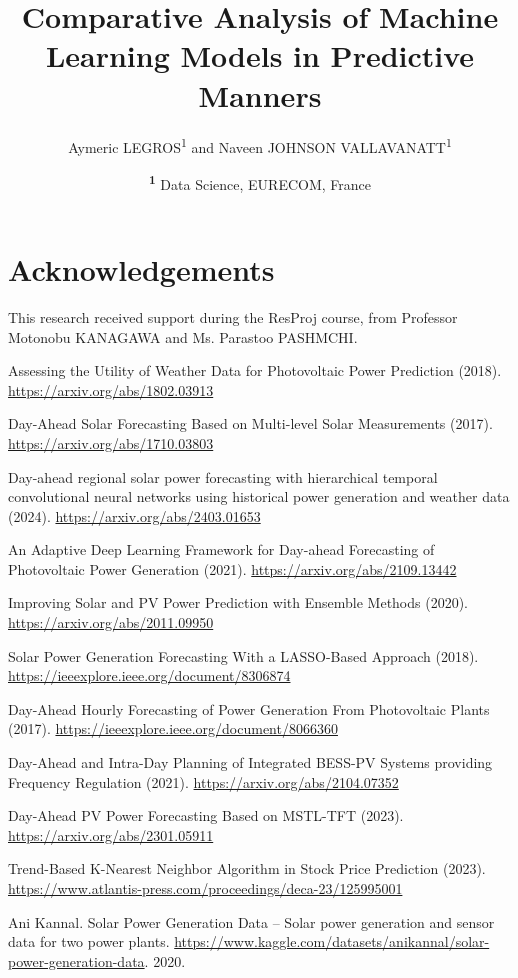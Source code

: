 \documentclass[twocolumn]{NobArticle}
\title{\centering Comparative Analysis of Machine Learning Models in Predictive Manners}
\author{\centering
    Aymeric LEGROS\textsuperscript{1}
    and Naveen JOHNSON VALLAVANATT\textsuperscript{1}
}
\date{\centering
    \textsuperscript{\textbf{1}}
    Data Science, EURECOM, France \\
}
\begin{document}
\small
\maketitle







\section*{Acknowledgements}
This research received support during the ResProj course, from Professor Motonobu KANAGAWA and Ms. Parastoo PASHMCHI.

\begin{thebibliography}{9}

Assessing the Utility of Weather Data for Photovoltaic Power Prediction (2018).
\url{https://arxiv.org/abs/1802.03913}

Day-Ahead Solar Forecasting Based on Multi-level Solar Measurements (2017).
\url{https://arxiv.org/abs/1710.03803}

Day-ahead regional solar power forecasting with hierarchical temporal convolutional neural networks using historical power generation and weather data (2024). 
\url{https://arxiv.org/abs/2403.01653}

An Adaptive Deep Learning Framework for Day-ahead Forecasting of Photovoltaic Power Generation (2021).
\url{https://arxiv.org/abs/2109.13442}

Improving Solar and PV Power Prediction with Ensemble Methods (2020).
\url{https://arxiv.org/abs/2011.09950}

Solar Power Generation Forecasting With a LASSO-Based Approach (2018).
\url{https://ieeexplore.ieee.org/document/8306874}

Day-Ahead Hourly Forecasting of Power Generation From Photovoltaic Plants (2017).
\url{https://ieeexplore.ieee.org/document/8066360}

Day-Ahead and Intra-Day Planning of Integrated BESS-PV Systems providing Frequency Regulation (2021).
\url{https://arxiv.org/abs/2104.07352}

Day-Ahead PV Power Forecasting Based on MSTL-TFT (2023).
\url{https://arxiv.org/abs/2301.05911}

Trend-Based K-Nearest Neighbor Algorithm in Stock Price Prediction (2023).
\url{https://www.atlantis-press.com/proceedings/deca-23/125995001}

Ani Kannal. Solar Power Generation Data – Solar power generation and sensor data for two power plants.
\url{https://www.kaggle.com/datasets/anikannal/solar-power-generation-data}.
2020.

\end{thebibliography}
\end{document}
